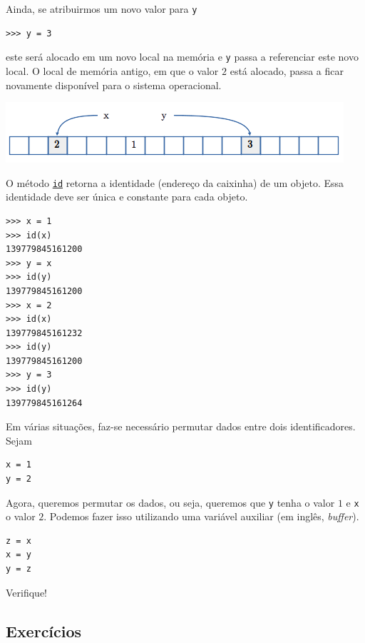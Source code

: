 Ainda, se atribuirmos um novo valor para \lstinline+y+
\begin{lstlisting}
>>> y = 3
\end{lstlisting}
este será alocado em um novo local na memória e \lstinline+y+ passa a referenciar este novo local. O local de memória antigo, em que o valor $2$ está alocado, passa a ficar novamente disponível para o sistema operacional.

\begin{center}
  \includegraphics[width=\textwidth]{./cap_lingua/dados/fig_aloc_mem/yRecebe3}
\end{center}

\begin{obs}
  O método {\python} \href{https://docs.python.org/3/library/functions.html?highlight=id#id}{\lstinline+id+} retorna a identidade (endereço da caixinha) de um objeto. Essa identidade deve ser única e constante para cada objeto.
\begin{lstlisting}
>>> x = 1
>>> id(x)
139779845161200
>>> y = x
>>> id(y)
139779845161200
>>> x = 2
>>> id(x)
139779845161232
>>> id(y)
139779845161200
>>> y = 3
>>> id(y)
139779845161264
\end{lstlisting}
\end{obs}

\begin{ex}\label{cap_lingua_sec_dados:ex:trocaVar}
Em várias situações, faz-se necessário permutar dados entre dois identificadores. Sejam
\begin{lstlisting}
x = 1
y = 2
\end{lstlisting}
Agora, queremos permutar os dados, ou seja, queremos que \lstinline+y+ tenha o valor $1$ e \lstinline+x+ o valor $2$. Podemos fazer isso utilizando uma variável auxiliar (em inglês, {\it buffer}).
\begin{lstlisting}
z = x
x = y
y = z
\end{lstlisting}
Verifique!
\end{ex}

\subsection{Exercícios}

